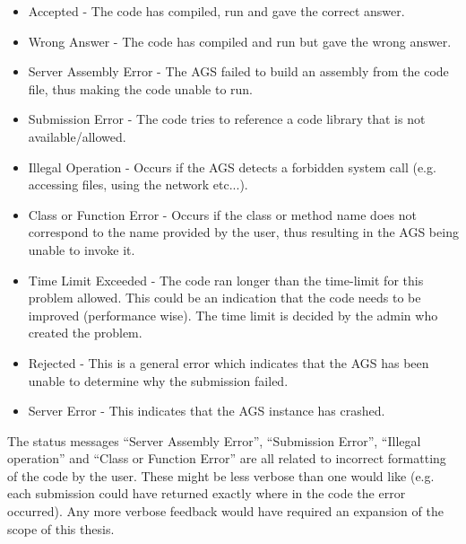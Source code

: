 \begin{itemize}
	\item Accepted - The code has compiled, run and gave the correct answer.
	\item Wrong Answer - The code has compiled and run but gave the wrong answer.
	\item Server Assembly Error - The AGS failed to build an assembly from the code file, thus making the code unable to run.
	\item Submission Error - The code tries to reference a code library that is not available/allowed.
	\item Illegal Operation - Occurs if the AGS detects a forbidden system call (e.g. accessing files, using the network etc...).
	\item Class or Function Error - Occurs if the class or method name does not correspond to the name provided by the user, thus resulting in the AGS being unable to invoke it.
	\item Time Limit Exceeded - The code ran longer than the time-limit for this problem allowed. This could be an indication that the code needs to be improved (performance wise). The time limit is decided by the admin who created the problem.
	\item Rejected - This is a general error which indicates that the AGS has been unable to determine why the submission failed.
	\item Server Error - This indicates that the AGS instance has crashed.
\end{itemize}

The status messages ``Server Assembly Error'', ``Submission Error'', ``Illegal operation'' and ``Class or Function Error'' are all related to incorrect formatting of the code by the user. These might be less verbose than one would like (e.g. each submission could have returned exactly where in the code the error occurred). Any more verbose feedback would have required an expansion of the scope of this thesis.

